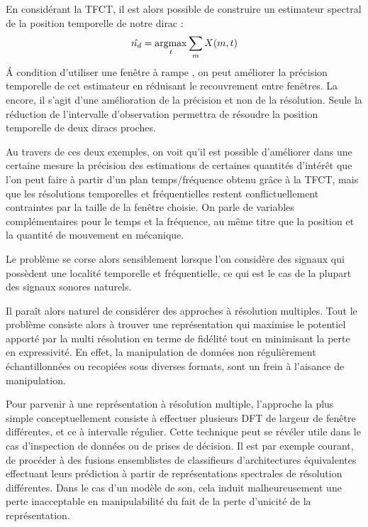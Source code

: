 En considérant la TFCT, il est alors possible de construire un estimateur \og spectral \fg de la position temporelle de notre dirac :
\begin{equation}
\hat{n_d} = \operatorname*{argmax}_t \sum_m X(m, t)
\end{equation}
\'A condition d'utiliser une fenêtre \fg à rampe \og, on peut améliorer la précision temporelle de cet estimateur en réduisant le recouvrement entre fenêtres. La encore, il s'agit d'une amélioration de la précision et non de la résolution. Seule la réduction de l'intervalle d'observation permettra de résoudre la position temporelle de deux diracs proches.

Au travers de ces deux exemples, on voit qu'il est possible d'améliorer dans une certaine mesure la précision des estimations de certaines quantités d'intérêt que l'on peut faire à partir d'un plan temps/fréquence obtenu grâce à la TFCT, mais que les résolutions temporelles et fréquentielles restent conflictuellement contraintes par la taille de la fenêtre choisie. On parle de variables complémentaires pour le temps et la fréquence, au même titre que la position et la quantité de mouvement en mécanique.

Le problème se corse alors sensiblement lorsque l'on considère des signaux qui possèdent une localité temporelle et fréquentielle, ce qui est le cas de la plupart des signaux sonores naturels.

Il paraît alors naturel de considérer des approches à résolution multiples. Tout le problème consiste alors à trouver une représentation qui maximise le potentiel apporté par la multi résolution en terme de fidélité tout en minimisant la perte en expressivité. En effet, la manipulation de données non régulièrement échantillonnées ou recopiées sous diverses formats, sont un frein à l'aisance de manipulation.

Pour parvenir à une représentation à résolution multiple, l'approche la plus simple conceptuellement consiste à \og effectuer \fg plusieurs DFT de largeur de fenêtre différentes, et ce à intervalle régulier. Cette technique peut se révéler utile dans le cas d'inspection de données ou de prises de décision. Il est par exemple courant, de procéder à des fusions ensemblistes de classifieurs d'architectures équivalentes effectuant leurs prédiction à partir de représentations spectrales de résolution différentes. Dans le cas d'un modèle de son, cela induit malheureusement une perte inacceptable en manipulabilité du fait de la perte d'unicité de la représentation.

